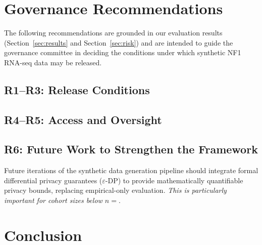 \documentclass[webpdf,contemporary,large]{oup-authoring-template}%
\theoremstyle{thmstyleone}%
\theoremstyle{thmstyletwo}%
\theoremstyle{thmstylethree}%
\begin{document}
\section{Governance Recommendations}
\label{sec:governance}

The following recommendations are grounded in our evaluation results
(Section~\ref{sec:results} and Section~\ref{sec:risk}) and are intended
to guide the governance committee in deciding the conditions under which
synthetic NF1 RNA-seq data may be released.

\subsection{R1--R3: Release Conditions}



\subsection{R4--R5: Access and Oversight}



\subsection{R6: Future Work to Strengthen the Framework}

\begin{recbox}[title={Recommendation  — Differential privacy integration}]
  Future iterations of the synthetic data generation pipeline should
  integrate formal differential privacy guarantees ($\varepsilon$-DP)
  to provide mathematically quantifiable privacy bounds, replacing
  empirical-only evaluation.
  \textit{This is particularly important for cohort sizes below $n = $}.
\end{recbox}

\section{Conclusion}
\end{document}
